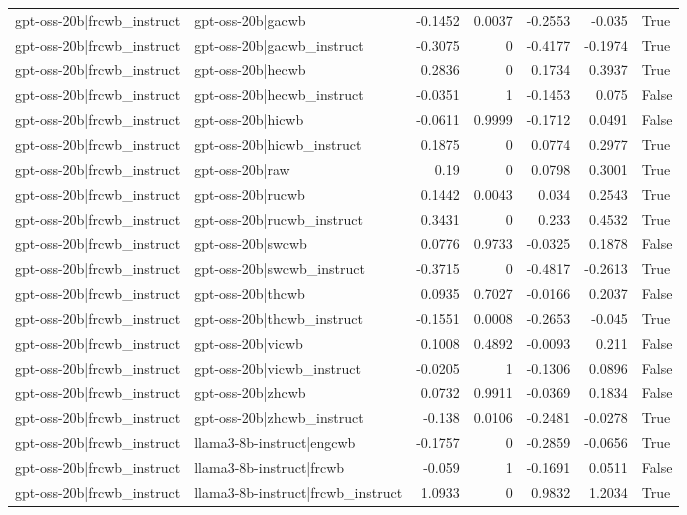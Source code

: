 \begin{table}
\begin{tabular}{l l r r r r l}
gpt-oss-20b|frcwb_instruct & gpt-oss-20b|gacwb & -0.1452 & 0.0037 & -0.2553 & -0.035 & True \\
gpt-oss-20b|frcwb_instruct & gpt-oss-20b|gacwb_instruct & -0.3075 & 0 & -0.4177 & -0.1974 & True \\
gpt-oss-20b|frcwb_instruct & gpt-oss-20b|hecwb & 0.2836 & 0 & 0.1734 & 0.3937 & True \\
gpt-oss-20b|frcwb_instruct & gpt-oss-20b|hecwb_instruct & -0.0351 & 1 & -0.1453 & 0.075 & False \\
gpt-oss-20b|frcwb_instruct & gpt-oss-20b|hicwb & -0.0611 & 0.9999 & -0.1712 & 0.0491 & False \\
gpt-oss-20b|frcwb_instruct & gpt-oss-20b|hicwb_instruct & 0.1875 & 0 & 0.0774 & 0.2977 & True \\
gpt-oss-20b|frcwb_instruct & gpt-oss-20b|raw & 0.19 & 0 & 0.0798 & 0.3001 & True \\
gpt-oss-20b|frcwb_instruct & gpt-oss-20b|rucwb & 0.1442 & 0.0043 & 0.034 & 0.2543 & True \\
gpt-oss-20b|frcwb_instruct & gpt-oss-20b|rucwb_instruct & 0.3431 & 0 & 0.233 & 0.4532 & True \\
gpt-oss-20b|frcwb_instruct & gpt-oss-20b|swcwb & 0.0776 & 0.9733 & -0.0325 & 0.1878 & False \\
gpt-oss-20b|frcwb_instruct & gpt-oss-20b|swcwb_instruct & -0.3715 & 0 & -0.4817 & -0.2613 & True \\
gpt-oss-20b|frcwb_instruct & gpt-oss-20b|thcwb & 0.0935 & 0.7027 & -0.0166 & 0.2037 & False \\
gpt-oss-20b|frcwb_instruct & gpt-oss-20b|thcwb_instruct & -0.1551 & 0.0008 & -0.2653 & -0.045 & True \\
gpt-oss-20b|frcwb_instruct & gpt-oss-20b|vicwb & 0.1008 & 0.4892 & -0.0093 & 0.211 & False \\
gpt-oss-20b|frcwb_instruct & gpt-oss-20b|vicwb_instruct & -0.0205 & 1 & -0.1306 & 0.0896 & False \\
gpt-oss-20b|frcwb_instruct & gpt-oss-20b|zhcwb & 0.0732 & 0.9911 & -0.0369 & 0.1834 & False \\
gpt-oss-20b|frcwb_instruct & gpt-oss-20b|zhcwb_instruct & -0.138 & 0.0106 & -0.2481 & -0.0278 & True \\
gpt-oss-20b|frcwb_instruct & llama3-8b-instruct|engcwb & -0.1757 & 0 & -0.2859 & -0.0656 & True \\
gpt-oss-20b|frcwb_instruct & llama3-8b-instruct|frcwb & -0.059 & 1 & -0.1691 & 0.0511 & False \\
gpt-oss-20b|frcwb_instruct & llama3-8b-instruct|frcwb_instruct & 1.0933 & 0 & 0.9832 & 1.2034 & True \\

\end{tabular}
\end{table}
